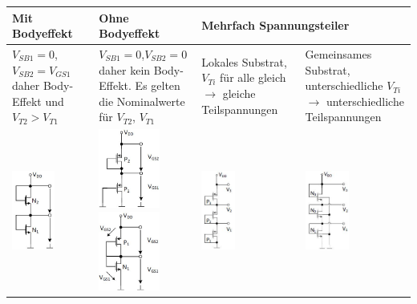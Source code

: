\begin{tabular}{|p{}|p{}|p{}|p{}|}
	\hline
	\textbf{Mit Bodyeffekt}&\textbf{Ohne Bodyeffekt}&\multicolumn{2}{l|}{\textbf{Mehrfach Spannungsteiler}}\\ \hline
	$V_{SB1}=0$, $V_{SB2}=V_{GS1}$ daher Body-Effekt und $V_{T2} > V_{T1}$&$V_{SB1}=0$,$V_{SB2}=0$ daher kein Body-Effekt. Es gelten die Nominalwerte für $V_{T2}$, $V_{T1}$&Lokales Substrat, $V_{Ti}$ für alle gleich $\rightarrow$ gleiche Teilspannungen&Gemeinsames Substrat, unterschiedliche $V_{Ti}$ $\rightarrow$ unterschiedliche Teilspannungen\\
	\includegraphics[height=2.6cm]{chapters/Diode/images/SpgT_N_Bodyeffekt}&
	\includegraphics[height=2.6cm]{chapters/Diode/images/SpgT_P_body}
	\includegraphics[height=2.6cm]{chapters/Diode/images/SpgT_PN}&
	\includegraphics[height=2.6cm]{chapters/Diode/images/SpgT_P3}&
	\includegraphics[height=2.6cm]{chapters/Diode/images/SpgT_N3}\\    
	\hline	
\end{tabular}
